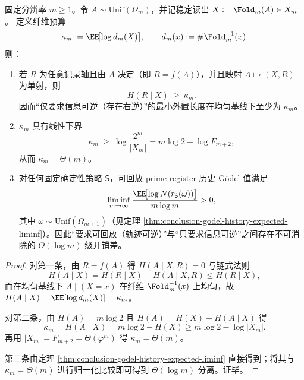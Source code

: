 \begin{theorem}\label{thm:conclusion-godel-vs-minimal-gap}
固定分辨率 \(m\ge 1\)。令 \(A\sim\mathrm{Unif}(\Omega_m)\)，并记稳定读出 \(X:=\Fold_m(A)\in X_m\)。
定义纤维预算
\[
\kappa_m:=\EE\!\bigl[\log d_m(X)\bigr],
\qquad d_m(x):=\#\Fold_m^{-1}(x).
\]
则：
\begin{enumerate}
  \item 若 \(R\) 为任意记录轴且由 \(A\) 决定（即 \(R=f(A)\)），并且映射 \(A\mapsto(X,R)\) 为单射，则
  \[
  H(R\mid X)\ \ge\ \kappa_m.
  \]
  因而“仅要求信息可逆（存在右逆）”的最小外置长度在均匀基线下至少为 \(\kappa_m\)。
  \item \(\kappa_m\) 具有线性下界
  \[
  \kappa_m\ \ge\ \log\frac{2^m}{|X_m|}
  =m\log 2-\log F_{m+2},
  \]
  从而 \(\kappa_m=\Theta(m)\)。
  \item 对任何固定确定性策略 \(\mathsf S\)，可回放 prime-register 历史 Gödel 值满足
  \[
  \liminf_{m\to\infty}\frac{\EE\!\bigl[\log N(r_{\mathsf S}(\omega))\bigr]}{m\log m}>0,
  \]
  其中 \(\omega\sim\mathrm{Unif}(\Omega_{m+1})\)（见定理 \ref{thm:conclusion-godel-history-expected-liminf}）。因此“要求可回放（轨迹可逆）”与“只要求信息可逆”之间存在不可消除的 \(\Theta(\log m)\) 级开销差。
\end{enumerate}
\end{theorem}
\begin{proof}
对第一条，由 \(R=f(A)\) 得 \(H(A\mid X,R)=0\) 与链式法则
\[
H(A\mid X)=H(R\mid X)+H(A\mid X,R)\le H(R\mid X),
\]
而在均匀基线下 \(A\mid(X=x)\) 在纤维 \(\Fold_m^{-1}(x)\) 上均匀，故
\(
H(A\mid X)=\EE[\log d_m(X)]=\kappa_m
\)。
\par
对第二条，由 \(H(A)=m\log 2\) 且 \(H(A)=H(X)+H(A\mid X)\) 得
\[
\kappa_m=H(A\mid X)=m\log 2-H(X)\ge m\log 2-\log|X_m|.
\]
再用 \(|X_m|=F_{m+2}=\Theta(\varphi^m)\) 得 \(\kappa_m=\Theta(m)\)。
\par
第三条由定理 \ref{thm:conclusion-godel-history-expected-liminf} 直接得到；将其与 \(\kappa_m=\Theta(m)\) 进行归一化比较即可得到 \(\Theta(\log m)\) 分离。证毕。
\end{proof}

